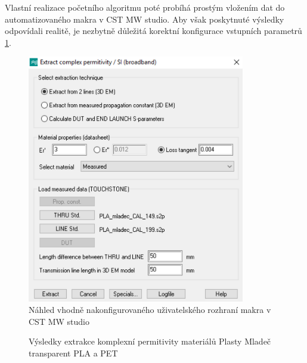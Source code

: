 Vlastní realizace početního algoritmu poté probíhá prostým vložením dat do automatizovaného makra v CST MW studio. Aby však poskytnuté výsledky odpovídali realitě, je nezbytně důležitá korektní konfigurace vstupních parametrů \ref{fig:CSTscript}.


\begin{figure}[!htbp]
\begin{center}
\includegraphics[width=9.5cm]{pics/CSTscript}
\caption{Náhled vhodně nakonfigurovaného uživatelského rozhraní makra v CST MW studio}
\label{fig:CSTscript}
\end{center}
\end{figure}


\begin{figure}[!htbp]
\label{fig:EpsReMeas}
\caption{Výsledky extrakce komplexní permitivity materiálů Plasty Mladeč transparent PLA a PET}
\end{figure}


